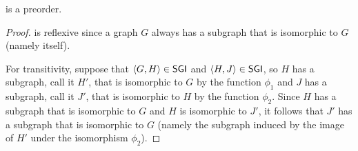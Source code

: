 \begin{proposition}
   is a preorder.
\end{proposition}
\begin{proof}
   is reflexive since a graph $G$ always has a subgraph that is isomorphic to $G$ (namely itself).

  For transitivity, suppose that $\langle G,H\rangle\in{\ensuremath{\mathsf{SGI}}}$ and $\langle H,J\rangle\in{\ensuremath{\mathsf{SGI}}}$, so $H$ has a subgraph, call it $H'$, that is isomorphic to $G$ by the function $\phi_1$ and $J$ has a subgraph, call it $J'$, that is isomorphic to $H$ by the function $\phi_2$.
  Since $H$ has a subgraph that is isomorphic to $G$ and $H$ is isomorphic to $J'$, it follows that $J'$ has a subgraph that is isomorphic to $G$ (namely the subgraph induced by the image of $H'$ under the isomorphism $\phi_2$).
\end{proof}
